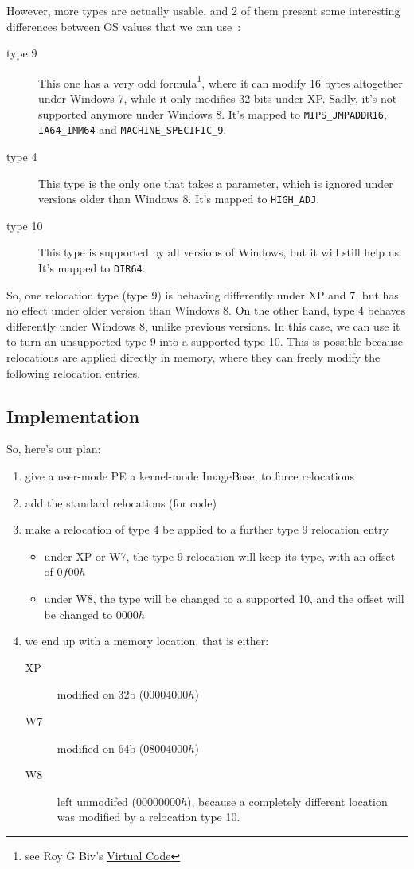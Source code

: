 \documentclass{article}
\begin{document}
However, more types are actually usable, and 2 of them present some interesting differences between OS values that we can use~:
\begin{description}
	\item[type 9] This one has a very odd formula\footnote{see Roy G Biv's \href{http://spth.virii.lu/v3/vessel/display/articles/roy g biv/vcode2.txt}{Virtual Code}}, where it can modify 16 bytes altogether under Windows 7, while it only modifies 32 bits under XP. Sadly, it's not supported anymore under Windows 8. It's mapped to {\tt MIPS\_JMPADDR16}, {\tt IA64\_IMM64} and {\tt MACHINE\_SPECIFIC\_9}.
	\item[type 4] This type is the only one that takes a parameter, which is ignored under versions older than Windows 8. It's mapped to {\tt HIGH\_ADJ}.
	\item[type 10] This type is supported by all versions of Windows, but it will still help us. It's mapped to {\tt DIR64}.
\end{description}

So, one relocation type (type 9) is behaving differently under XP and 7, but has no effect under older version than Windows 8.
On the other hand, type 4 behaves differently under Windows 8, unlike previous versions. In this case, we can use it to turn an unsupported type 9 into a supported type 10. This is possible because relocations are applied directly in memory, where they can freely modify the following relocation entries.

\subsection{Implementation}
So, here's our plan:
\begin{enumerate}
\item give a user-mode PE a kernel-mode ImageBase, to force relocations
\item add the standard relocations (for code)
\item make a relocation of type 4 be applied to a further type 9 relocation entry
\begin{itemize}
\item under XP or W7, the type 9 relocation will keep its type, with an offset of $0f00h$
\item under W8, the type will be changed to a supported 10, and the offset will be changed to $0000h$
\end{itemize}
\item we end up with a memory location, that is either:
\begin{description}
\item[XP] modified on 32b ($00004000h$)
\item[W7] modified on 64b ($08004000h$)
\item[W8] left unmodifed ($00000000h$), because a completely different location was modified by a relocation type 10.

\end{description}
\end{enumerate}
\end{document}
